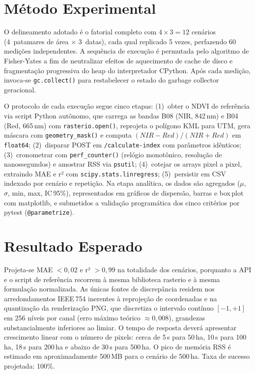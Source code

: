 \documentclass[10pt, a4paper, twocolumn]{article}
\begin{document}
\section{Método Experimental}

O delineamento adotado é o fatorial completo com $4 \times 3 = 12$ cenários (4~patamares de área $\times$ 3~datas), cada qual replicado 5 vezes, perfazendo 60 medições independentes. A sequência de execução é permutada pelo algoritmo de Fisher-Yates a fim de neutralizar efeitos de aquecimento de cache de disco e fragmentação progressiva do heap do interpretador CPython. Após cada medição, invoca-se \texttt{gc.collect()} para restabelecer o estado do garbage collector geracional.

O protocolo de cada execução segue cinco etapas: (1)~obter o NDVI de referência via script Python autônomo, que carrega as bandas B08 (NIR, 842\,nm) e B04 (Red, 665\,nm) com \texttt{rasterio.open()}, reprojeta o polígono KML para UTM, gera máscara com \texttt{geometry\_mask()} e computa $(NIR\!-\!Red)/(NIR\!+\!Red)$ em \texttt{float64}; (2)~disparar POST em \texttt{/calculate-index} com parâmetros idênticos; (3)~cronometrar com \texttt{perf\_counter()} (relógio monotônico, resolução de nanossegundos) e amostrar RSS via \texttt{psutil}; (4)~cotejar os arrays pixel a pixel, extraindo MAE e r² com \texttt{scipy.stats.linregress}; (5)~persistir em CSV indexado por cenário e repetição. Na etapa analítica, os dados são agregados ($\mu$, $\sigma$, min, max, IC\,95\%), representados em gráficos de dispersão, barras e box\,plot com matplotlib, e submetidos a validação programática dos cinco critérios por pytest (\texttt{@parametrize}).

\section{Resultado Esperado}

Projeta-se MAE $< 0{,}02$ e r² $> 0{,}99$ na totalidade dos cenários, porquanto a API e o script de referência recorrem à mesma biblioteca rasterio e à mesma formulação normalizada. As únicas fontes de discrepância residem nos arredondamentos IEEE\,754 inerentes à reprojeção de coordenadas e na quantização da renderização PNG, que discretiza o intervalo contínuo $[-1,+1]$ em 256 níveis por canal (erro máximo teórico $\approx 0{,}008$), grandezas substancialmente inferiores ao limiar. O tempo de resposta deverá apresentar crescimento linear com o número de pixels: cerca de 5\,s para 50\,ha, 10\,s para 100\,ha, 18\,s para 200\,ha e abaixo de 30\,s para 500\,ha. O pico de memória RSS é estimado em aproximadamente 500\,MB para o cenário de 500\,ha. Taxa de sucesso projetada: 100\%.
\end{document}
